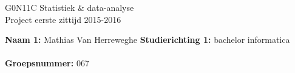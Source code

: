 \documentclass{article}
\begin{document}
\begin{titlepage}
\renewcommand{\familydefault}{\sfdefault}
\normalfont
	\begin{center}
		\begin{framed}
			\LARGE{
			\vspace{0.7cm}
			G0N11C Statistiek \& data-analyse \\
			Project eerste zittijd 2015-2016 
			\vspace{0.8cm}
			}%
		\end{framed}
	\end{center}

\vspace{0.7cm}
\large{
\textbf{Naam 1:} Mathias Van Herreweghe \hfill \textbf{Studierichting 1:} bachelor informatica
\\
\hfill
\\
\textbf{Groepsnummer:} 067
}
\end{titlepage}
\end{document}
